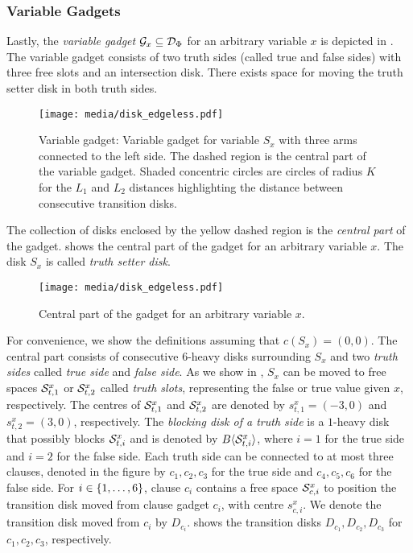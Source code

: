 \begin{toappendix}
\begin{toappendix}
\subsubsection{Variable Gadgets}

Lastly, the \emph{variable gadget} $\G_x \subseteq \cstate$ for an arbitrary variable $x$ is depicted in . 
The variable gadget consists of two truth sides (called true and false sides) with three free slots and an intersection disk. 
There exists space for moving the truth setter disk in both truth sides.

\begin{figure}[!htb]
    \centering
    \texttt{[image: media/disk\_edgeless.pdf]}
    \caption{Variable gadget: Variable gadget for variable $S_x$ with three arms connected to the left side. The dashed region is the central part of the variable gadget. Shaded concentric circles are circles of radius $K$ for the $L_1$ and $L_2$ distances highlighting the distance between consecutive transition disks.}
    \label{fig:variable_gadget}
\end{figure}

The collection of disks enclosed by the yellow dashed region is the \emph{central part} of the gadget. 
 shows the central part of the gadget for an arbitrary variable $x$.
The disk ${S}_x$ is called \emph{truth setter disk}. 

\begin{figure}[!htb]
    \centering
    \texttt{[image: media/disk\_edgeless.pdf]}
    \caption{Central part of the gadget for an arbitrary variable $x$.}
    \label{fig:variable_names}
\end{figure}

For convenience, we show the definitions assuming that $c(S_x) = (0,0)$.
The central part consists of consecutive $6$-heavy disks surrounding $S_x$ and two \emph{truth sides} called \emph{true side} and \emph{false side}.
As we show in , $S_x$ can be moved to free spaces $\S_{t,1}^x$ or $\S_{t,2}^x$ called \emph{truth slots}, representing the false or true value given $x$, respectively.
The centres of $\S_{t,1}^x$ and $\S_{t,2}^x$ are denoted by $s^x_{t,1} = (-3,0)$ and $s^x_{t,2} = (3,0)$, respectively.
The \emph{blocking disk of a truth side} is a $1$-heavy disk that possibly blocks $\S_{t,i}^x$ and is denoted by $\bdisk{\S^x_{t,i}}$, where $i = 1$ for the true side and $i=2$ for the false side.
Each truth side can be connected to at most three clauses, denoted in the figure by $c_1,c_2,c_3$ for the true side and $c_4,c_5,c_6$ for the false side.
For $i \in \set{1,\ldots,6}$, clause $c_i$ contains a free space $\S_{c,i}^x$ to position the transition disk moved from clause gadget $c_i$, with centre $s_{c,i}^x$.
We denote the transition disk moved from $c_i$ by $D_{c_i}$.
 shows the transition disks $D_{c_1},D_{c_2},D_{c_3}$ for $c_1,c_2,c_3$, respectively.


\end{toappendix}
\end{toappendix}
